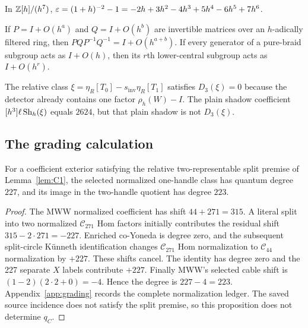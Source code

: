 \begin{lemma}\label{lem:eps-of-h}
In $\mathbb{Z}[h]/(h^7)$,
$\varepsilon=(1+h)^{-2}-1=-2h+3h^2-4h^3+5h^4-6h^5+7h^6$.
\end{lemma}

\begin{lemma}\label{lem:commutator-order}
If $P=I+O(h^a)$ and $Q=I+O(h^b)$ are invertible matrices over an
$h$-adically filtered ring, then $PQP^{-1}Q^{-1}=I+O(h^{a+b})$.  If every
generator of a pure-braid subgroup acts as $I+O(h)$, then its $r$th
lower-central subgroup acts as $I+O(h^r)$.
\end{lemma}

\begin{remark}\label{rem:vT-xi}
The relative class $\xi=\eta_R[T_0]-s_{\mathrm{inv}}\eta_R[T_1]$ satisfies
$D_3(\xi)=0$ because the detector already contains one factor
$\rho_h(W)-I$.  The plain shadow coefficient $[h^3]\ell\operatorname{Sh}_h(\xi)$ equals
$2624$, but that plain shadow is not $D_3(\xi)$.
\end{remark}

\subsection{The grading calculation}

\begin{proposition}\label{prop:degree-223}
For a coefficient exterior satisfying the relative two-representable split
premise of Lemma~\ref{lem:C1}, the
selected normalized one-handle class has quantum degree $227$, and its image
in the two-handle quotient has degree $223$.
\end{proposition}

\begin{proof}
The MWW normalized coefficient has shift $44+271=315$.  A literal split into
two normalized $\mathcal C_{271}$ Hom factors initially contributes the
residual shift $315-2\cdot271=-227$.  Enriched co-Yoneda is degree zero, and
the subsequent split-circle K\"unneth identification changes
$\mathcal C_{271}$ Hom normalization to $\mathcal C_{44}$ normalization by
$+227$.  These shifts cancel.  The identity has degree zero and the 227
separate $X$ labels contribute $+227$.  Finally MWW's selected cable shift is
$(1-2)(2\cdot2+0)=-4$.  Hence the degree is $227-4=223$.
Appendix~\ref{app:grading} records the complete normalization ledger.
The saved source incidence does not satisfy the split premise, so this
proposition does not determine $q_C$.
\end{proof}

